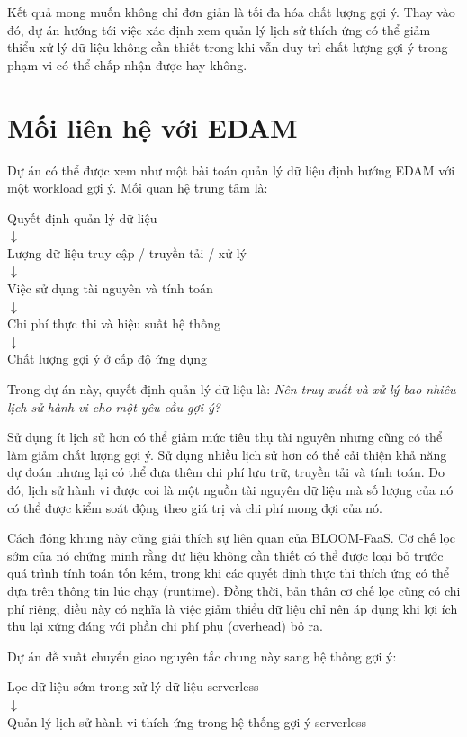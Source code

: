 \documentclass[12pt,a4paper]{article}
\begin{document}
Kết quả mong muốn không chỉ đơn giản là tối đa hóa chất lượng gợi ý. Thay vào đó, dự án hướng tới việc xác định xem quản lý lịch sử thích ứng có thể giảm thiểu xử lý dữ liệu không cần thiết trong khi vẫn duy trì chất lượng gợi ý trong phạm vi có thể chấp nhận được hay không.

\section{Mối liên hệ với EDAM}

Dự án có thể được xem như một bài toán quản lý dữ liệu định hướng EDAM với một workload gợi ý. Mối quan hệ trung tâm là:

\begin{center}
Quyết định quản lý dữ liệu \\
$\downarrow$ \\
Lượng dữ liệu truy cập / truyền tải / xử lý \\
$\downarrow$ \\
Việc sử dụng tài nguyên và tính toán \\
$\downarrow$ \\
Chi phí thực thi và hiệu suất hệ thống \\
$\downarrow$ \\
Chất lượng gợi ý ở cấp độ ứng dụng
\end{center}

Trong dự án này, quyết định quản lý dữ liệu là: \textit{Nên truy xuất và xử lý bao nhiêu lịch sử hành vi cho một yêu cầu gợi ý?}

Sử dụng ít lịch sử hơn có thể giảm mức tiêu thụ tài nguyên nhưng cũng có thể làm giảm chất lượng gợi ý. Sử dụng nhiều lịch sử hơn có thể cải thiện khả năng dự đoán nhưng lại có thể đưa thêm chi phí lưu trữ, truyền tải và tính toán. Do đó, lịch sử hành vi được coi là một nguồn tài nguyên dữ liệu mà số lượng của nó có thể được kiểm soát động theo giá trị và chi phí mong đợi của nó.

Cách đóng khung này cũng giải thích sự liên quan của BLOOM-FaaS. Cơ chế lọc sớm của nó chứng minh rằng dữ liệu không cần thiết có thể được loại bỏ trước quá trình tính toán tốn kém, trong khi các quyết định thực thi thích ứng có thể dựa trên thông tin lúc chạy (runtime). Đồng thời, bản thân cơ chế lọc cũng có chi phí riêng, điều này có nghĩa là việc giảm thiểu dữ liệu chỉ nên áp dụng khi lợi ích thu lại xứng đáng với phần chi phí phụ (overhead) bỏ ra.

Dự án đề xuất chuyển giao nguyên tắc chung này sang hệ thống gợi ý:
\begin{center}
Lọc dữ liệu sớm trong xử lý dữ liệu serverless \\
$\downarrow$ \\
Quản lý lịch sử hành vi thích ứng trong hệ thống gợi ý serverless
\end{center}
\end{document}

